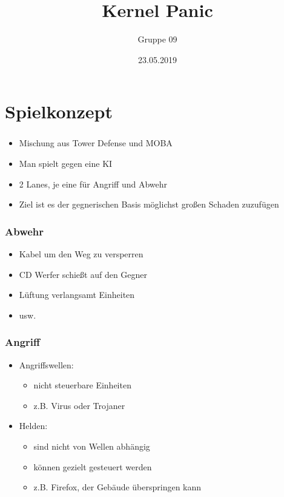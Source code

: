\documentclass{beamer}
\title{Kernel Panic}
\author{Gruppe 09}
\date{23.05.2019}
\begin{document}
{
\frame{}
}

\section[Outline]{}
\frame{\tableofcontents}

\section{Spielkonzept}
\begin{frame}
\frametitle{\secname}
\begin{itemize}
\item Mischung aus Tower Defense und MOBA
\item Man spielt gegen eine KI
\item 2 Lanes, je eine für Angriff und Abwehr
\item Ziel ist es der gegnerischen Basis möglichst großen Schaden zuzufügen
\end{itemize}
\end{frame}

\begin{frame}
\frametitle{Abwehr}
\begin{itemize}
\item Kabel um den Weg zu versperren
\item CD Werfer schießt auf den Gegner
\item Lüftung verlangsamt Einheiten
\item usw.
\end{itemize}
\end{frame}

\begin{frame}
\frametitle{Angriff}
\begin{itemize}
\item Angriffswellen:
\begin{itemize}
\item nicht steuerbare Einheiten
\item z.B. Virus oder Trojaner
\end{itemize}
\item Helden:
\begin{itemize}
\item sind nicht von Wellen abhängig
\item können gezielt gesteuert werden
\item z.B. Firefox, der Gebäude überspringen kann
\end{itemize}
\end{itemize}
\end{frame}
\end{document}
